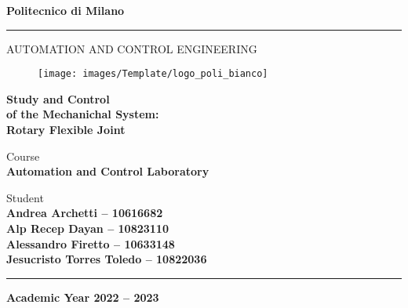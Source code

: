 \documentclass[a4paper,12pt,openright,notitlepage,oneside]{book}
\begin{document}
	\begin{titlepage}

		\begin{center}
			\Large{\textbf{Politecnico di Milano}} \\
			\vspace{-4mm}
			\rule{\textwidth}{0.4pt}
			\normalsize{AUTOMATION AND CONTROL ENGINEERING} \\
			\vspace{24mm}
			
			\begin{figure}[h!]
				\centering
				\texttt{[image: images/Template/logo\_poli\_bianco]}
			\end{figure}

			\vspace{25mm}

			\huge{\textbf{Study and Control}} \\
			\huge{\textbf{of the Mechanichal System:}} \\
			\huge{\textbf{Rotary Flexible Joint}} \\
			\vspace{15mm}
		\end{center}

		
		\begin{flushright}
			\normalsize{Course} \\
			\small{\textbf{Automation and Control Laboratory}} \\
		\end{flushright}

		\vspace{0.5mm}

		\begin{flushright}
			\normalsize{Student} \\
			\small{\textbf{Andrea Archetti -- 10616682}} \\
			\small{\textbf{Alp Recep Dayan -- 10823110}} \\
			\small{\textbf{Alessandro 	Firetto -- 10633148}} \\
			\small{\textbf{Jesucristo Torres Toledo -- 10822036}} \\
		\end{flushright}

		\begin{center}
			\rule{\textwidth}{0.4pt}
			\small{\textbf{Academic Year 2022 -- 2023}}
		\end{center}
	\end{titlepage}

	\mainmatter %

	\tableofcontents

	
	
	
	
	

	
\end{document}
